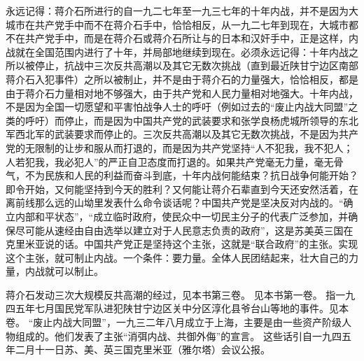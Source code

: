 永远记得：蒋介石所进行的自一九二七年至一九三七年的十年内战，并不是因为大城市在共产党手中而不在蒋介石手中，恰恰相反，从一九二七年到现在，大城市都不在共产党手中，而是在蒋介石或蒋介石所让与的日本和汉奸手中，正是这样，内战就在全国范围内进行了十年，并局部地继续到现在。必须永远记得：十年内战之所以被停止，抗战中三次反共高潮以及其它无数次挑战（直到最近陕甘宁边区南部蒋介石入犯事件）之所以被制止，并不是由于蒋介石的力量强大，恰恰相反，都是由于蒋介石力量相对地不够强大，由于共产党和人民力量相对地强大。十年内战，不是因为全国一切愿望和平害怕战争人士的呼吁（例如过去的“废止内战大同盟”之类的呼吁）而停止，而是因为中国共产党的武装要求和张学良杨虎城所领导的东北军西北军的武装要求而停止的。三次反共高潮以及其它无数次挑战，不是因为共产党的无限制的让步和服从而打退的，而是因为共产党坚持“人不犯我，我不犯人；人若犯我，我必犯人”的严正自卫态度而打退的。如果共产党毫无力量，毫无骨气，不为民族和人民的利益而奋斗到底，十年内战何能结束？抗日战争何能开始？即令开始，又何能坚持到今天的胜利？又何能让蒋介石辈直到今天还安然活着，在离前线那么远的山坳里发表什么命令谈话呢？中国共产党是坚决反对内战的。“确立内部和平状态”，“成立临时政府，使民众中一切民主分子的代表广泛参加，并确保尽可能从速经由自由选举以建立对于人民意志负责的政府”，这是苏美英三国在克里米亚说的话。中国共产党正是坚持这个主张，这就是“联合政府”的主张。实现这个主张，就可制止内战。一个条件：要力量。全体人民团结起来，壮大自己的力量，内战就可以制止。


\begin{maonote}
蒋介石发动三次大规模反共高潮的经过，见本书第三卷。
见本书第一卷。
指一九四五年七月国民党军队进犯陕甘宁边区关中分区淳化县爷台山等地的事件。见本卷。
“废止内战大同盟”，一九三二年八月成立于上海，主要是由一些资产阶级人物组成的。他们发表了主张“消弭内战、共御外侮”的宣言。
这些话引自一九四五年二月十一日苏、美、英三国克里米亚（雅尔塔）会议公报。
\end{maonote}
